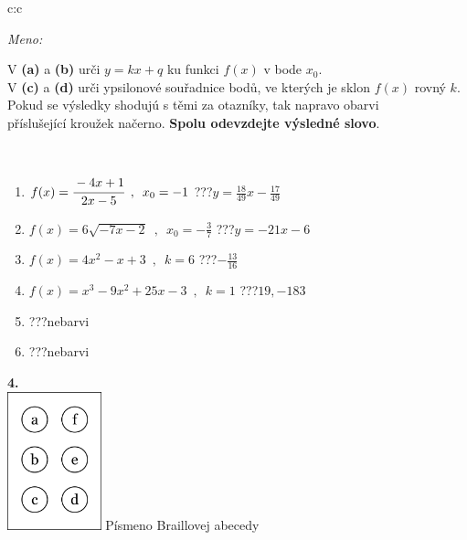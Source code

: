 \documentclass[10pt]{report}
\begin{document}
\begin{tabular}{c:c}
\begin{minipage}[c][104.5mm][t]{0.5\linewidth}
\begin{center}
\textit{Meno:}\phantom{xxxxxxxxxxxxxxxxxxxxxxxxxxxxxxxxxxxxxxxxxxxxxxxxxxxxxxxxxxxxxxxxx}\\[5mm]
\begin{minipage}{0.95\linewidth}
\begin{center}
V \textbf{(a)} a \textbf{(b)} urči  $y = kx + q$ ku funkci $f(x)$ v bode $x_0$.\\V \textbf{(c)} a \textbf{(d)} urči ypsilonové souřadnice bodů, ve kterých je sklon $f(x)$ rovný $k$.\\Pokud se výsledky shodujú s těmi za otazníky, tak napravo obarvi\\příslušející kroužek načerno. \textbf{Spolu odevzdejte výsledné slovo}.
\end{center}
\end{minipage}
\\[1mm]
\begin{minipage}{0.79\linewidth}
\begin{center}
\begin{varwidth}{\linewidth}
\begin{enumerate}
\small
\item $f(x)=\cfrac{-4x+1}{2x-5}\enspace , \enspace x_0=-1$\quad \dotfill\; ???\;\dotfill \quad $y = \frac{18}{49}x-\frac{17}{49}$
\item $f(x)=6\sqrt{-7x-2}\enspace , \enspace x_0=-\frac{3}{7}$\quad \dotfill\; ???\;\dotfill \quad $y = -21x-6$
\item $f(x)=4x^2-x+3\enspace , \enspace k=6$\quad \dotfill\; ???\;\dotfill \quad $-\frac{13}{16}$
\item $f(x)=x^3-9x^2+25x-3\enspace , \enspace k=1$\quad \dotfill\; ???\;\dotfill \quad $19 , -183$
\item \quad \dotfill\; ???\;\dotfill \quad nebarvi
\item \quad \dotfill\; ???\;\dotfill \quad nebarvi
\end{enumerate}
\end{varwidth}
\end{center}
\end{minipage}
\begin{minipage}{0.20\linewidth}
\begin{center}
{\Huge\bfseries 4.} \\[2mm]
\includegraphics[height=40mm]{../images/braille.png}
{\small Písmeno Braillovej abecedy}
\end{center}
\end{minipage}
\end{center}
\end{minipage}
%
\end{tabular}
\end{document}
